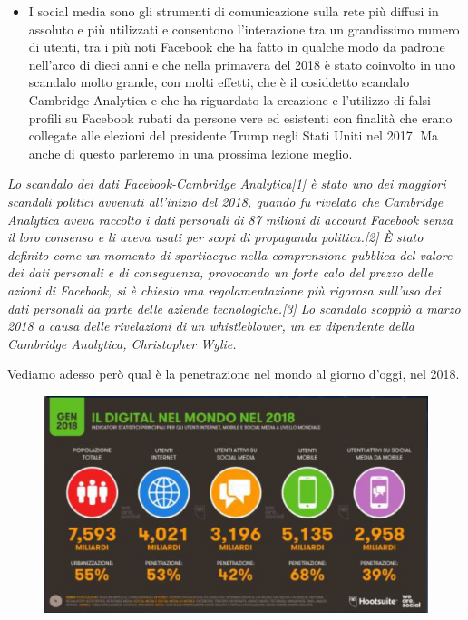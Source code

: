 \begin{itemize}
        \item I social media sono gli strumenti di comunicazione sulla rete più diffusi in assoluto e più utilizzati e consentono l'interazione tra un grandissimo numero di utenti, tra i più noti Facebook che ha fatto in qualche modo da padrone nell'arco di dieci anni e che nella primavera del 2018 è stato coinvolto in uno scandalo molto grande, con molti effetti, che è il cosiddetto scandalo Cambridge Analytica e che ha riguardato la creazione e l'utilizzo di falsi profili su Facebook rubati da persone vere ed esistenti con finalità che erano collegate alle elezioni del presidente Trump negli Stati Uniti nel 2017. Ma anche di questo parleremo in una prossima lezione meglio. 
    \end{itemize}

    \textit{Lo scandalo dei dati Facebook-Cambridge Analytica[1] è stato uno dei maggiori scandali politici avvenuti all'inizio del 2018, quando fu rivelato che Cambridge Analytica aveva raccolto i dati personali di 87 milioni di account Facebook senza il loro consenso e li aveva usati per scopi di propaganda politica.[2] È stato definito come un momento di spartiacque nella comprensione pubblica del valore dei dati personali e di conseguenza, provocando un forte calo del prezzo delle azioni di Facebook, si è chiesto una regolamentazione più rigorosa sull'uso dei dati personali da parte delle aziende tecnologiche.[3]
    Lo scandalo scoppiò a marzo 2018 a causa delle rivelazioni di un whistleblower, un ex dipendente della Cambridge Analytica, Christopher Wylie.}
    
        
     
      Vediamo adesso però qual è la penetrazione nel mondo al giorno d'oggi, nel 2018. 
      
      \begin{figure}[h]
          \centering
          \includegraphics[width=0.75\linewidth]{images/06_lez_fig_02.jpg}
      \end{figure}
      
